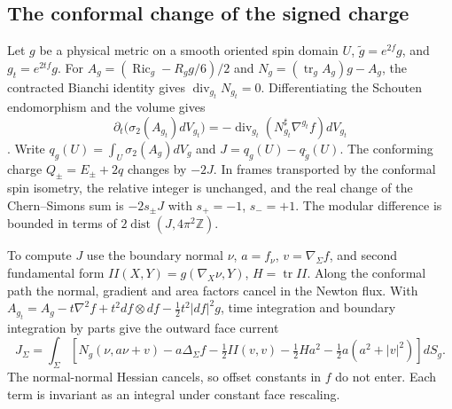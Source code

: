 \documentclass[11pt]{article}
\theoremstyle{definition}
\theoremstyle{remark}
\begin{document}
\subsection{The conformal change of the signed charge}

Let \(g\) be a physical metric on a smooth oriented spin domain \(U\), \(\widetilde g=e^{2f}g\), and \(g_t=e^{2tf}g\). For \(A_g=(\operatorname{Ric}_g-R_g g/6)/2\) and \(N_g=(\operatorname{tr}_gA_g)g-A_g\), the contracted Bianchi identity gives \(\operatorname{div}_{g_t}N_{g_t}=0\). Differentiating the Schouten endomorphism and the volume gives
\[
 \partial_t\big(\sigma_2(A_{g_t})dV_{g_t}\big)
 =-\operatorname{div}_{g_t}(N_{g_t}^{\sharp}\nabla^{g_t}f)dV_{g_t}
\]
\cite[\S2.1]{GurskyStreets2018TwoYamabe}. Write \(q_g(U)=\int_U\sigma_2(A_g)dV_g\) and \(J=q_g(U)-q_{\widetilde g}(U)\). The conforming charge \(Q_\pm=E_\pm+2q\) changes by \(-2J\). In frames transported by the conformal spin isometry, the relative integer is unchanged, and the real change of the Chern--Simons sum is \(-2s_\pm J\) with \(s_+=-1\), \(s_-=+1\). The modular difference is bounded in terms of \(2\operatorname{dist}(J,4\pi^2\mathbb Z)\).

To compute \(J\) use the boundary normal \(\nu\), \(a=f_\nu\), \(v=\nabla_\Sigma f\), and second fundamental form \(II(X,Y)=g(\nabla_X\nu,Y)\), \(H=\operatorname{tr}II\). Along the conformal path the normal, gradient and area factors cancel in the Newton flux. With \(A_{g_t}=A_g-t\nabla^2f+t^2df\otimes df-\tfrac12t^2|df|^2g\), time integration and boundary integration by parts give the outward face current
\[
 J_\Sigma=\int_\Sigma\left[
  N_g(\nu,a\nu+v)-a\Delta_\Sigma f-\tfrac12 II(v,v)
  -\tfrac12 H a^2-\tfrac12a(a^2+|v|^2)\right]dS_g .
\]
The normal-normal Hessian cancels, so offset constants in \(f\) do not enter. Each term is invariant as an integral under constant face rescaling.
\end{document}
